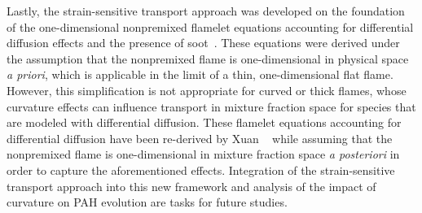 Lastly, the strain-sensitive transport approach was developed on the foundation of the one-dimensional nonpremixed flamelet equations accounting for differential diffusion effects and the presence of soot~\cite{pitsch1998,mueller2012}. These equations were derived under the assumption that the nonpremixed flame is one-dimensional in physical space \textit{a priori}, which is applicable in the limit of a thin, one-dimensional flat flame. However, this simplification is not appropriate for curved or thick flames, whose curvature effects can influence transport in mixture fraction space for species that are modeled with differential diffusion. These flamelet equations accounting for differential diffusion have been re-derived by Xuan \etal~\cite{xuan2014} while assuming that the nonpremixed flame is one-dimensional in mixture fraction space \textit{a posteriori} in order to capture the aforementioned effects. Integration of the strain-sensitive transport approach into this new framework and analysis of the impact of curvature on PAH evolution are tasks for future studies.
